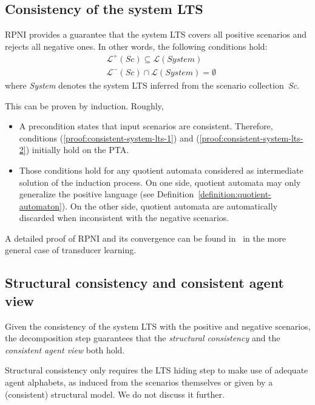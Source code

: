 
\subsection{Consistency of the system LTS\label{subsection:system-lts-consistency}}

RPNI provides a guarantee that the system LTS covers all positive scenarios and rejects all negative ones. In other words, the following conditions hold:
\begin{align}
&\mathcal{L}^+(Sc) \subseteq \mathcal{L}(System)\label{proof:consistent-system-lts-1}\\
&\mathcal{L}^-(Sc) \cap      \mathcal{L}(System) = \emptyset\label{proof:consistent-system-lts-2}
\end{align}
where \emph{System} denotes the system LTS inferred from the scenario collection~\emph{Sc}.

This can be proven by induction. Roughly, 
\begin{itemize}
\item A precondition states that input scenarios are consistent. Therefore, conditions (\ref{proof:consistent-system-lts-1}) and (\ref{proof:consistent-system-lts-2}) initially hold on the PTA.
\item Those conditions hold for any quotient automata considered as intermediate solution of the induction process. On one side, quotient automata may only generalize the positive language (see Definition~\ref{definition:quotient-automaton}). On the other side, quotient automata are automatically discarded when inconsistent with the negative scenarios.
\end{itemize}

A detailed proof of RPNI and its convergence can be found in~\cite{Oncina:1993} in the more general case of transducer learning.


\subsection{Structural consistency and consistent agent view\label{subsection:consistent-agent-view}}

Given the consistency of the system LTS with the positive and negative scenarios, the decomposition step guarantees that the \emph{structural consistency} and the \emph{consistent agent view} both hold.

Structural consistency only requires the LTS hiding step to make use of adequate agent alphabets, as induced from the scenarios themselves or given by a (consistent) structural model. We do not discuss it further. 

